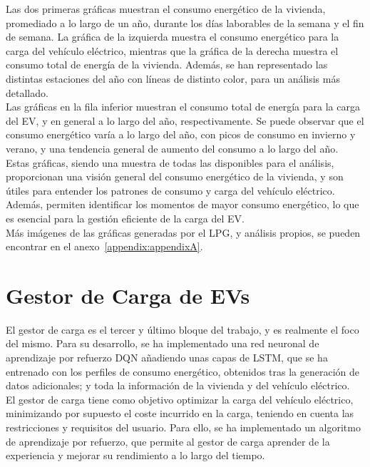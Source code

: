 Las dos primeras gráficas muestran el consumo energético de la vivienda, promediado a lo largo de 
un año, durante los días laborables de la semana y el fin de semana. La gráfica de la izquierda 
muestra el consumo energético para la carga del vehículo eléctrico, mientras que la gráfica de la 
derecha muestra el consumo total de energía de la vivienda. Además, se han representado las 
distintas estaciones del año con líneas de distinto color, para un análisis más detallado.\\

Las gráficas en la fila inferior muestran el consumo total de energía para la carga del EV, y en
general a lo largo del año, respectivamente. Se puede observar que el consumo energético varía a lo 
largo del año, con picos de consumo en invierno y verano, y una tendencia general de aumento del 
consumo a lo largo del año.\\

Estas gráficas, siendo una muestra de todas las disponibles para el análisis, proporcionan una 
visión general del consumo energético de la vivienda, y son útiles para entender los patrones de
consumo y carga del vehículo eléctrico. Además, permiten identificar los momentos de mayor
consumo energético, lo que es esencial para la gestión eficiente de la carga del EV.\\

Más imágenes de las gráficas generadas por el LPG, y análisis propios, se pueden encontrar en el
anexo~\ref{appendix:appendixA}.

\section{Gestor de Carga de EVs}
El gestor de carga es el tercer y último bloque del trabajo, y es realmente el foco del mismo. 
Para su desarrollo, se ha implementado una red neuronal de aprendizaje por refuerzo DQN añadiendo 
unas capas de LSTM, que se ha entrenado con los perfiles de consumo energético, obtenidos tras la 
generación de datos adicionales; y toda la información de la vivienda y del vehículo eléctrico.\\

El gestor de carga tiene como objetivo optimizar la carga del vehículo eléctrico, minimizando por 
supuesto el coste incurrido en la carga, teniendo en cuenta las restricciones y requisitos del usuario. 
Para ello, se ha implementado un algoritmo de aprendizaje por refuerzo, que permite al gestor de carga 
aprender de la experiencia y mejorar su rendimiento a lo largo del tiempo.\\

